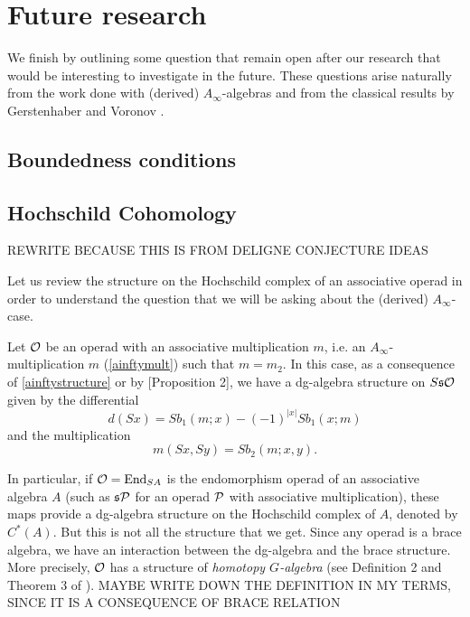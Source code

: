 \documentclass[Thesis.tex]{subfiles}
\begin{document}

\chapter{Future research}\label{future}

We finish by outlining some question that remain open after our research that would be interesting to investigate in the future. These questions arise naturally from the work done with (derived) $A_\infty$-algebras and from the classical results by Gerstenhaber and Voronov \cite{GV}.

\section{Boundedness conditions}


\section{Hochschild Cohomology}

REWRITE BECAUSE THIS IS FROM DELIGNE CONJECTURE IDEAS

Let us review the structure on the Hochschild complex of an associative operad in order to understand the question that we will be asking about the (derived) $A_\infty$-case.

Let ${\mathcal O}$ be an operad with an associative multiplication $m$, i.e. an $A_\infty$-multiplication $m$ (\cref{ainftymult}) such that $m=m_2$. In this case, as a consequence of \cref{ainftystructure} or by \cite{GV}[Proposition 2], we have a dg-algebra structure on $S\mathfrak{s}{\mathcal O}$ given by the differential
\[d(Sx) =  Sb_1(m; x) -(-1)^{|x|}Sb_1(x; m)\]
and the multiplication
\[m(Sx,Sy) = Sb_2(m;x,y).\]

In particular, if ${\mathcal O} = \operatorname{End}_{SA}$ is the endomorphism operad of an associative algebra $A$ (such as $\mathfrak{s}\mathcal{P}$ for an operad $\mathcal{P}$ with associative multiplication), these maps provide a dg-algebra structure on the Hochschild complex of $A$, denoted by $C^*(A)$. But this is not all the structure that we get. Since any operad is a brace algebra, we have an interaction between the dg-algebra and the brace structure. More precisely, ${\mathcal O}$ has a structure of \emph{homotopy $G$-algebra} (see Definition 2 and Theorem 3 of \cite{GV}). MAYBE WRITE DOWN THE DEFINITION IN MY TERMS, SINCE IT IS A CONSEQUENCE OF BRACE RELATION
\end{document}
